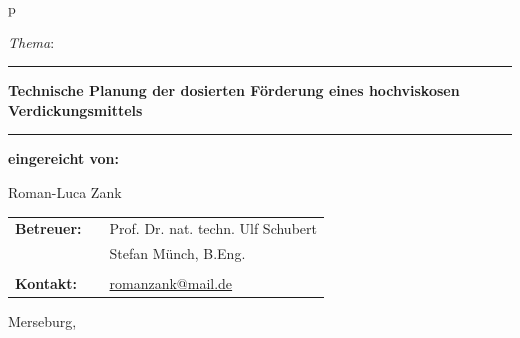 \begin{center}
\begin{tabular}{p{\textwidth}}
\vspace*{5.5mm}

\begin{center}
	\LARGE{\textit{Thema}:}
\end{center}

\vspace{-5.5mm}

\rule{\textwidth}{0.4pt}
\begin{center}
\textbf{\LARGE{Technische Planung der dosierten Förderung eines hochviskosen Verdickungsmittels}}
\end{center}
\vspace*{-5mm}
\rule{\textwidth}{0.4pt}

\vspace*{13.5mm}

\begin{center}
\Large{\textbf{eingereicht von:}} \\ 
\end{center}
\begin{center}
\Large{Roman-Luca Zank} \\
\end{center}


\vspace*{13.5mm}

\begin{center}
\begin{tabular}{lll}
\Large{\textbf{Betreuer:}}&& \Large{Prof. Dr. nat. techn. Ulf Schubert}\\
&& \Large{Stefan Münch, B.Eng.}\\
&&\\
\Large{\textbf{Kontakt:}}&& \Large{\href{mailto:romanzank@mail.de}{romanzank@mail.de} }\\
\end{tabular}
\end{center}

\end{tabular}
\end{center}

\vfill

\large{Merseburg, \todayDE}
